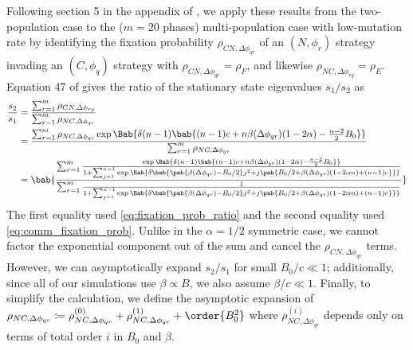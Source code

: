 Following section 5 in the appendix of \tripp{},
we apply these results from the two-population case
to the ($m=20$ phases) multi-population case with low-mutation rate
by identifying the fixation probability $\rho_{CN,\Delta \phi_{qr}}$
of an $(N,\phi_r)$ strategy invading an $(C,\phi_q)$ strategy
with $\rho_{CN,\Delta \phi_{qr}} = \rho_F$,
and likewise
$\rho_{NC,\Delta \phi_{rq}} = \rho_E$.
Equation 47 of \tripp{}
gives the ratio of the stationary state eigenvalues $s_1/s_2$ as
\begin{align}
  \frac{s_2}{s_1} &= \frac
    {\sum_{r=1}^{m} \rho_{CN,\Delta \phi_{rq}}}
    {\sum_{r=1}^{m} \rho_{NC,\Delta \phi_{qr}} }
  \\
  &=
  \frac
  {\sum_{r=1}^{m} \rho_{NC,\Delta \phi_{qr}}
    \exp \Bab{
      \delta (n-1)
      \bab{
        (n-1) c + n \beta(\Delta \phi_{qr}) (1 - 2 \alpha)
        - \frac{n-2}{2} B_0
      }
    }
  }
  {\sum_{r=1}^{m} \rho_{NC,\Delta \phi_{qr}}}
  \\
  &=
  \bab{
    \frac
    {\sum_{r=1}^{m} \frac
      {\exp \Bab{ \delta (n-1)
        \bab{
          (n-1) c + n \beta(\Delta \phi_{qr}) (1 - 2 \alpha) - \frac{n-2}{2} B_0
        }}
      }
      {1 + \sum_{j=1}^{n-1} \exp\Bab{
        \delta \bab{
         \pab{\beta(\Delta \phi_{qr}) - B_0/2} j^2
         + j \pab{B_0/2 + \beta(\Delta \phi_{qr}) (1 - 2 \alpha n) + (n-1) c}
        }}
      }
    }
    {\sum_{r=1}^{m} \frac{1}
      {1 + \sum_{j=1}^{n-1} \exp\Bab{
        \delta \bab{
         \pab{\beta(\Delta \phi_{qr}) - B_0/2} j^2
         + j \pab{B_0/2 + \beta(\Delta \phi_{qr}) (1 - 2 \alpha n) + (n-1) c}
        }}
      }
    }
  }
  \label{eq:full_analytic_frac}
\end{align}
The first equality used \cref{eq:fixation_prob_ratio}
and the second equality used \cref{eq:comm_fixation_prob}.
Unlike in the $\alpha = 1/2$ symmetric case, we cannot factor the
exponential component out of the sum and cancel the $\rho_{CN,\Delta
\phi_{qr}}$ terms.
However, we can asymptotically expand $s_2/s_1$ for small $B_0/c \ll 1$;
additionally, since all of our simulations use $\beta \propto B$,
we also assume $\beta/c \ll 1$.
Finally, to simplify the calculation,
we define the asymptotic expansion of
$\rho_{NC,\Delta \phi_{qr}} \coloneqq
\rho_{NC,\Delta \phi_{qr}}^{(0)}
+
\rho_{NC,\Delta \phi_{qr}}^{(1)}
+
\order{B_0^2}
$
where
$
\rho_{NC,\Delta \phi_{qr}}^{(i)}
$
depends only on terms of total order $i$ in $B_0$ and $\beta$.

